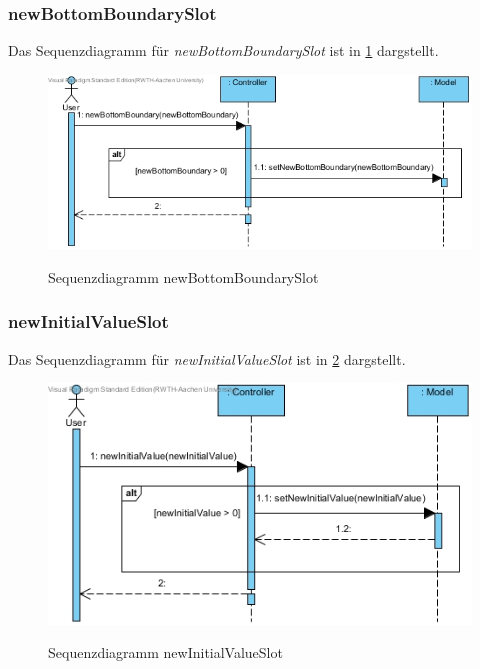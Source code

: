 \subsubsection*{newBottomBoundarySlot}

Das Sequenzdiagramm für \emph{newBottomBoundarySlot} ist in \ref{Sequenzdiagramm newBottomBoundarySlot} dargstellt.

\begin{figure}[H]
	\centering
	\includegraphics[scale=.6]{Bilder/Controller__newBottomBoundarySlot().jpg}\\
	\caption{Sequenzdiagramm newBottomBoundarySlot}
	\label{Sequenzdiagramm newBottomBoundarySlot}
\end{figure}

\subsubsection*{newInitialValueSlot}

Das Sequenzdiagramm für \emph{newInitialValueSlot} ist in \ref{Sequenzdiagramm newInitialValueSlot} dargstellt.

\begin{figure}[H]
	\centering
	\includegraphics[scale=.6]{Bilder/Controller__newInitialValueSlot().jpg}\\
	\caption{Sequenzdiagramm newInitialValueSlot}
	\label{Sequenzdiagramm newInitialValueSlot}
\end{figure}

